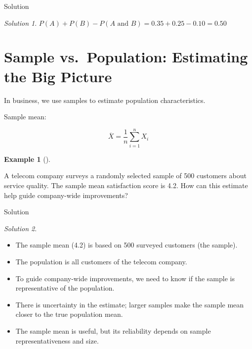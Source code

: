 \documentclass[
  12pt,
  letterpaper,
]{scrbook}
\providecommand{\tightlist}{%
  \setlength{\itemsep}{0pt}\setlength{\parskip}{0pt}}
\renewcommand{\tightlist}{\setlength{\itemsep}{0.5\baselineskip}\setlength{\parskip}{0.2\baselineskip}}
\theoremstyle{plain}
\theoremstyle{definition}
\newtheorem{example}{Example}[chapter]
\theoremstyle{remark}
\newtheorem{refsolution}{Solution}[chapter]
\begin{document}
Solution

\begin{refsolution}
\leavevmode

\(P(A) + P(B) - P(A \text{ and } B) = 0.35 + 0.25 - 0.10 = 0.50\)

\label{sol-2}

\end{refsolution}

\section{Sample vs.~Population: Estimating the Big
Picture}\label{sample-vs.-population-estimating-the-big-picture}

In business, we use samples to estimate population characteristics.

Sample mean:

\[
\overline{X} = \frac{1}{n} \sum_{i=1}^n X_i
\]

\begin{example}[]\protect\hypertarget{exm-telecom}{}\label{exm-telecom}

A telecom company surveys a randomly selected sample of 500 customers
about service quality. The sample mean satisfaction score is 4.2. How
can this estimate help guide company-wide improvements?

\end{example}

Solution

\begin{refsolution}
\leavevmode

\begin{itemize}
\tightlist
\item
  The sample mean (4.2) is based on 500 surveyed customers (the sample).
\item
  The population is all customers of the telecom company.
\item
  To guide company-wide improvements, we need to know if the sample is
  representative of the population.
\item
  There is uncertainty in the estimate; larger samples make the sample
  mean closer to the true population mean.
\item
  The sample mean is useful, but its reliability depends on sample
  representativeness and size.
\end{itemize}

\label{sol-telecom}

\end{refsolution}
\end{document}
